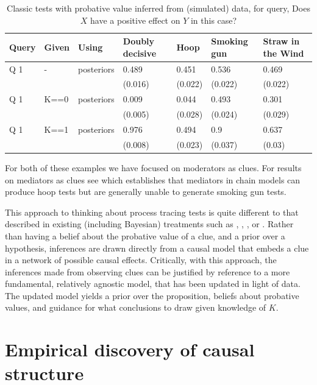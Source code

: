 \documentclass[
  12pt,
]{book}
\begin{document}
\begin{table}

\caption{\label{tab:testsfinite}Classic tests with probative value inferred from (simulated) data, for query, Does $X$ have a positive effect on $Y$ in this case?}
\centering
\begin{tabular}[t]{lllllll}
\toprule
Query & Given & Using & Doubly decisive & Hoop & Smoking gun & Straw in the Wind\\
\midrule
Q 1 & - & posteriors & 0.489 & 0.451 & 0.536 & 0.469\\
 &  &  & (0.016) & (0.022) & (0.022) & (0.022)\\
Q 1 & K==0 & posteriors & 0.009 & 0.044 & 0.493 & 0.301\\
 &  &  & (0.005) & (0.028) & (0.024) & (0.029)\\
Q 1 & K==1 & posteriors & 0.976 & 0.494 & 0.9 & 0.637\\
\addlinespace
 &  &  & (0.008) & (0.023) & (0.037) & (0.03)\\
\bottomrule
\end{tabular}
\end{table}

For both of these examples we have focused on moderators as clues. For results on mediators as clues see \citet{dawid2019bounding} which establishes that mediators in chain models can produce hoop tests but are generally unable to generate smoking gun tests.

This approach to thinking about process tracing tests is quite different to that described in existing (including Bayesian) treatments such as \citet{collier2011understanding}, \citet{BennettAppendix}, \citet{fairfield2017explicit}, or \citet{humphreys2015mixing}. Rather than having a belief about the probative value of a clue, and a prior over a hypothesis, inferences are drawn directly from a causal model that embeds a clue in a network of possible causal effects. Critically, with this approach, the inferences made from observing clues can be justified by reference to a more fundamental, relatively agnostic model, that has been updated in light of data. The updated model yields a prior over the proposition, beliefs about probative values, and guidance for what conclusions to draw given knowledge of \(K\).

\hypertarget{empirical-discovery-of-causal-structure}{%
\section{Empirical discovery of causal structure}\label{empirical-discovery-of-causal-structure}}
\end{document}
